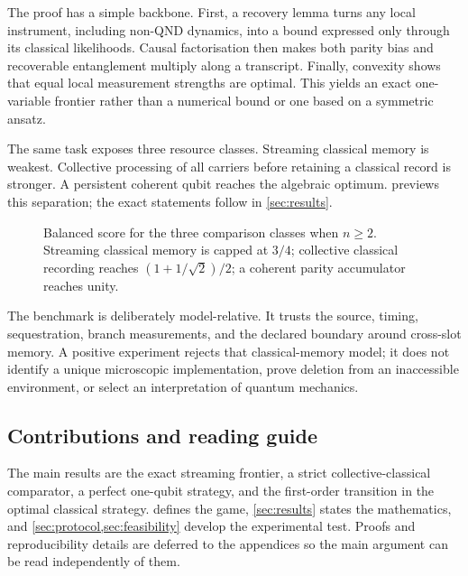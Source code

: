 The proof has a simple backbone. First, a recovery lemma turns any local instrument, including non-QND dynamics, into a bound expressed only through its classical likelihoods. Causal factorisation then makes both parity bias and recoverable entanglement multiply along a transcript. Finally, convexity shows that equal local measurement strengths are optimal. This yields an exact one-variable frontier rather than a numerical bound or one based on a symmetric ansatz.

The same task exposes three resource classes. Streaming classical memory is weakest. Collective processing of all carriers before retaining a classical record is stronger. A persistent coherent qubit reaches the algebraic optimum.  previews this separation; the exact statements follow in \cref{sec:results}.

\begin{figure}[t]
\centering

\caption{Balanced score for the three comparison classes when $n\geq2$. Streaming classical memory is capped at $3/4$; collective classical recording reaches $(1+1/\sqrt2)/2$; a coherent parity accumulator reaches unity.}
\label{fig:resource-ladder}
\end{figure}

The benchmark is deliberately model-relative. It trusts the source, timing, sequestration, branch measurements, and the declared boundary around cross-slot memory. A positive experiment rejects that classical-memory model; it does not identify a unique microscopic implementation, prove deletion from an inaccessible environment, or select an interpretation of quantum mechanics.

\subsection{Contributions and reading guide}

The main results are the exact streaming frontier, a strict collective-classical comparator, a perfect one-qubit strategy, and the first-order transition in the optimal classical strategy.  defines the game, \cref{sec:results} states the mathematics, and \cref{sec:protocol,sec:feasibility} develop the experimental test. Proofs and reproducibility details are deferred to the appendices so the main argument can be read independently of them.
